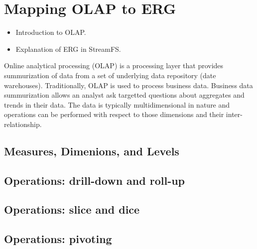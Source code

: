 \section{Mapping OLAP to ERG}

\begin{itemize}
\item Introduction to OLAP.
\item Explanation of ERG in StreamFS.
\end{itemize}
Online analytical processing (OLAP) is a processing layer that provides summurization of data
from a set of underlying data repository (date warehouses).  Traditionally, OLAP is used to process
business data.  Business data summurization allows an analyst ask targetted questions about aggregates 
and trends in their data.  The data is typically multidimensional in nature and operations can be performed with
respect to those dimensions and their inter-relationship.

\subsection{Measures, Dimenions, and Levels}

\subsection{Operations: drill-down and roll-up}

\subsection{Operations: slice and dice}

\subsection{Operations: pivoting}